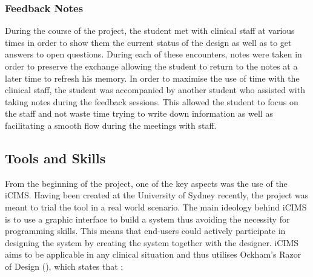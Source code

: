 \subsubsection{Feedback Notes}
During the course of the project, the student met with clinical staff at various times in order to show them the current status of the design as well as to get answers to open questions. During each of these encounters, notes were taken in order to preserve the exchange allowing the student to return to the notes at a  later time to refresh his memory. In order to maximise the use of time with the clinical staff, the student was accompanied by another student who assisted with taking notes during the feedback sessions. This allowed the student to focus on the staff and not waste time trying to write down information as well as facilitating a smooth flow during the meetings with staff.


\subsection{Tools and Skills}
From the beginning of the project, one of the key aspects was the use of the \gls{iCIMS}.  Having been created at the University of Sydney recently, the project was meant to trial the tool in a real world scenario. The main ideology behind iCIMS is to use a graphic interface to build a system thus avoiding the necessity for programming skills. This means that end-users could actively participate in designing the system by creating the system together with the designer. iCIMS aims to be applicable in any clinical situation and thus utilises Ockham's Razor of Design (\cite{Budd}), which states that :

